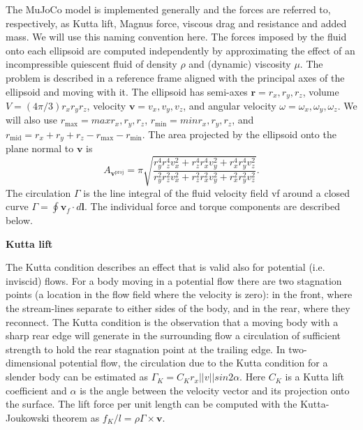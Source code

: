 \documentclass[sn-mathphys-num]{sn-jnl}%
\theoremstyle{thmstyleone}%
\theoremstyle{thmstyletwo}%
\theoremstyle{thmstylethree}%
\begin{document}
\begin{appendices}
The MuJoCo model is implemented generally and the forces are referred to, respectively, as Kutta lift, Magnus force, viscous drag and resistance and added mass. 
We will use this naming convention here. 
The forces imposed by the fluid onto each ellipsoid are computed independently by approximating the effect of an incompressible quiescent fluid of density $ \rho $ and (dynamic) viscosity $ \mu $. 
The problem is described in a reference frame aligned with the principal axes of the ellipsoid and moving with it. 
The ellipsoid has semi-axes $ \mathbf{r} = {r_x, r_y, r_z} $, volume $ V = (4 \pi / 3) r_x r_y r_z $, velocity $ \mathbf{v} = {v_x, v_y, v_z} $, and angular velocity $ \omega = {\omega_x, \omega_y, \omega_z} $. 
We will also use $ r_\text{max} = max {r_x, r_y, r_z} $, $ r_\text{min} = min{r_x, r_y, r_z} $, and $ r_\text{mid} = r_x + r_y + r_z - r_\text{max} - r_\text{min} $. 
The area projected by the ellipsoid onto the plane normal to $ \mathbf{v} $ is
%
\begin{equation}\label{eq:projected_eare}
	A_{\mathbf{v}^\text{proj}} = 
		\pi
		\sqrt{
			\frac{
				r_y^4 r_z^4 v_x^2 +
				r_z^4 r_x^4 v_y^2 +
				r_x^4 r_y^4 v_z^2
			}{
				r_y^2 r_z^2 v_x^2 +
				r_z^2 r_x^2 v_y^2 +
				r_x^2 r_y^2 v_z^2
			}
		}.
\end{equation}
%
The circulation $ \Gamma $ is the line integral of the fluid velocity field vf around a closed curve $ \Gamma = \oint \mathbf{v}_f \cdot d\mathbf{l} $. 
The individual force and torque components are described below.


\textbf{Kutta lift}

The Kutta condition describes an effect that is valid also for potential (i.e. inviscid) flows. 
For a body moving in a potential flow there are two stagnation points (a location in the flow field where the velocity is zero): 
in the front, where the stream-lines separate to either sides of the body, 
and in the rear, where they reconnect. 
The Kutta condition is the observation that a moving body with a sharp rear edge will generate in the surrounding flow a circulation of sufficient strength to hold the rear stagnation point at the trailing edge. 
In two-dimensional potential flow, the circulation due to the Kutta condition for a slender body can be estimated as $ \Gamma_K = C_K r_x || v || sin 2\alpha $. 
Here $ C_K $ is a Kutta lift coefficient and $ \alpha $ is the angle between the velocity vector and its projection onto the surface. 
The lift force per unit length can be computed with the Kutta-Joukowski theorem as $ f_K / l = \rho \Gamma \times \mathbf{v} $.



\end{appendices}
\end{document}
